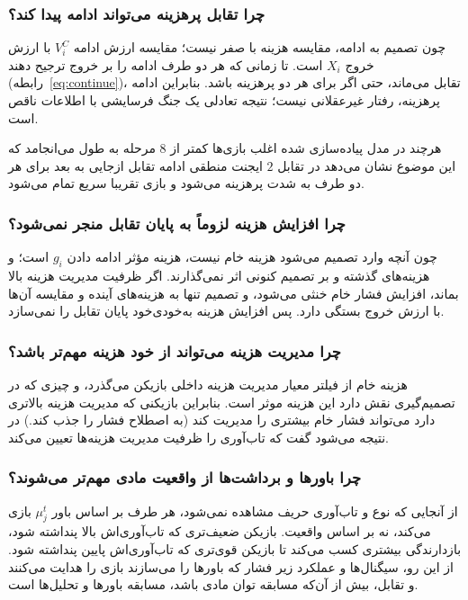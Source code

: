 \documentclass[12pt]{article}
\begin{document}
\subsubsection*{چرا تقابل پرهزینه می‌تواند ادامه پیدا کند؟}

چون تصمیم به ادامه، مقایسه هزینه با صفر نیست؛
مقایسه ارزش ادامه $V_i^C$ با ارزش خروج $X_i$ است.
تا زمانی که هر دو طرف ادامه را بر خروج ترجیح دهند (رابطه~\eqref{eq:continue})،
تقابل می‌ماند، حتی اگر برای هر دو پرهزینه باشد.
بنابراین ادامه پرهزینه، رفتار غیرعقلانی نیست؛
نتیجه تعادلی یک جنگ فرسایشی با اطلاعات ناقص است.

هرچند در مدل پیاده‌سازی شده اغلب بازی‌ها کمتر از $8$ 
مرحله به طول می‌انجامد که این موضوع نشان می‌دهد در تقابل $2$ 
ایجنت منطقی ادامه تقابل ازجایی به بعد برای هر دو طرف به شدت پرهزینه می‌شود و بازی تقریبا سریع تمام می‌شود. 

\subsubsection*{چرا افزایش هزینه لزوماً به پایان تقابل منجر نمی‌شود؟}

 چون آنچه وارد تصمیم می‌شود هزینه خام نیست، هزینه مؤثر  ادامه دادن
$g_i$ است؛
و هزینه‌های گذشته و بر تصمیم کنونی اثر نمی‌گذارند.
اگر ظرفیت مدیریت هزینه بالا بماند، افزایش فشار خام خنثی می‌شود،
و تصمیم تنها به هزینه‌های آینده و مقایسه آن‌ها با ارزش خروج بستگی دارد.
پس افزایش هزینه به‌خودی‌خود پایان تقابل را نمی‌سازد.

\subsubsection*{چرا مدیریت هزینه می‌تواند از خود هزینه مهم‌تر باشد؟}
هزینه خام از فیلتر معیار مدیریت هزینه داخلی بازیکن می‌گذرد، و چیزی که 
در تصمیم‌گیری نقش دارد این هزینه موثر است. بنابراین بازیکنی
که مدیریت هزینه بالاتری دارد می‌تواند فشار خام بیشتری را مدیریت کند
(به اصطلاح فشار را جذب کند.)
در نتیجه می‌شود گفت که تاب‌آوری را ظرفیت مدیریت هزینه‌ها تعیین می‌کند.

\subsubsection*{چرا باورها و برداشت‌ها از واقعیت مادی مهم‌تر می‌شوند؟}

از آنجایی که نوع و تاب‌آوری حریف مشاهده نمی‌شود،
هر طرف بر اساس باور $\mu_j^t$
 بازی می‌کند، نه بر اساس واقعیت.
بازیکن ضعیف‌تری که تاب‌آوری‌اش بالا پنداشته شود، بازدارندگی بیشتری کسب می‌کند
تا بازیکن قوی‌تری که تاب‌آوری‌اش پایین پنداشته شود.
از این رو، سیگنال‌ها و عملکرد زیر فشار که باورها را می‌سازند بازی را هدایت می‌کنند
و تقابل، بیش از آن‌که مسابقه توان مادی باشد، مسابقه باورها و تحلیل‌ها است.
\end{document}
